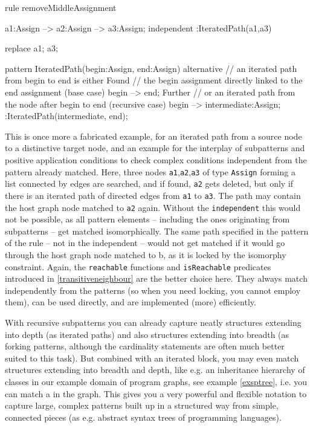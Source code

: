 \begin{example}
  \begin{grgen}
rule removeMiddleAssignment
{
  a1:Assign --> a2:Assign --> a3:Assign;
  independent {
    :IteratedPath(a1,a3)
  }
  
  replace {
    a1; a3;
  }
}

pattern IteratedPath(begin:Assign, end:Assign)
{
  alternative { // an iterated path from begin to end is either
    Found { // the begin assignment directly linked to the end assignment (base case)
      begin --> end;
    }
    Further { // or an iterated path from the node after begin to end (recursive case)
      begin --> intermediate:Assign;
      :IteratedPath(intermediate, end);
    }
  }
}
  \end{grgen}

This is once more a fabricated example, for an iterated path from a source node to a distinctive target node, and an example for the interplay of subpatterns and positive application conditions to check complex conditions independent from the pattern already matched.
Here, three nodes \texttt{a1},\texttt{a2},\texttt{a3} of type \texttt{Assign} forming a list connected by edges are searched, and if found, \texttt{a2} gets deleted, but only if there is an iterated path of directed edges from \texttt{a1} to \texttt{a3}.
The path may contain the host graph node matched to \texttt{a2} again.
Without the \texttt{independent} this would not be possible, as all pattern elements -- including the ones originating from subpatterns -- get matched isomorphically. 
The same path specified in the pattern of the rule -- not in the independent -- would not get matched if it would go through the host graph node matched to b, as it is locked by the isomorphy constraint.
Again, the \texttt{reachable} functions and \texttt{isReachable} predicates introduced in \ref{transitiveneighbour} are the better choice here.
They always match independently from the patterns (so when you need locking, you cannot employ them), can be used directly, and are implemented (more) efficiently. 
\end{example}

With recursive subpatterns you can already capture neatly structures extending into depth (as iterated paths)
and also structures extending into breadth (as forking patterns, although the cardinality statements are often much better suited to this task).
But combined with an iterated block, you may even match structures extending into breadth and depth,
like e.g. an inheritance hierarchy of classes in our example domain of program graphs, see example \ref{exsptree}, i.e. you can match a  in the graph.
This gives you a very powerful and flexible notation to capture large, complex patterns
built up in a structured way from simple, connected pieces (as e.g. abstract syntax trees of programming languages). 

